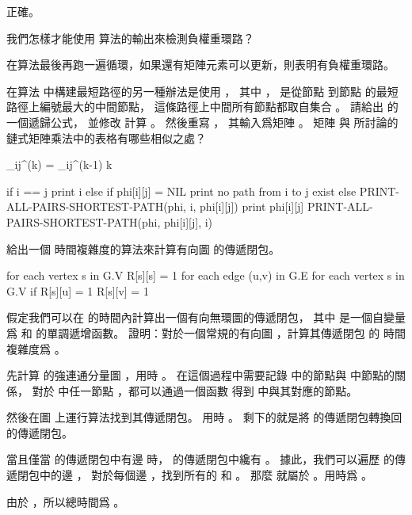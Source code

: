 \startANSWER
正確。
\stopANSWER

\startEXERCISE
我們怎樣才能使用  算法的輸出來檢測負權重環路？
\stopEXERCISE

\startANSWER
在算法最後再跑一遍循環，如果還有矩陣元素可以更新，則表明有負權重環路。
\stopANSWER

\startEXERCISE
在算法  中構建最短路徑的另一種辦法是使用 ，
其中 ，
  是從節點  到節點  的最短路徑上編號最大的中間節點，
這條路徑上中間所有節點都取自集合 。
請給出  的一個遞歸公式，
並修改  計算 。
然後重寫 ，
其輸入爲矩陣 。
矩陣 \m{\Phi} 與 所討論的鏈式矩陣乘法中的表格有哪些相似之處？
\stopEXERCISE

\startANSWER
\startformula
\phi_{ij}^{(k)} = \startcases
\NC \phi_{ij}^{(k-1)} \MC {} \NR
\NC k \MC {} \NR
\stopcases
\stopformula

\startCLRS
if i == j
	print i
else if phi[i][j] = NIL
	print no path from i to j exist
else
	PRINT-ALL-PAIRS-SHORTEST-PATH(phi, i, phi[i][j])
	print phi[i][j]
	PRINT-ALL-PAIRS-SHORTEST-PATH(phi, phi[i][j], i)
\stopCLRS
\stopANSWER

\startEXERCISE
給出一個  時間複雜度的算法來計算有向圖  的傳遞閉包。
\stopEXERCISE

\startANSWER
\startCLRS
for each vertex s in G.V
	R[s][s] = 1
for each edge (u,v) in G.E
	for each vertex s in G.V
		if R[s][u] = 1
			R[s][v] = 1
\stopCLRS
\stopANSWER

\startEXERCISE
假定我們可以在  的時間內計算出一個有向無環圖的傳遞閉包，
其中  是一個自變量爲  和  的單調遞增函數。
證明：對於一個常規的有向圖 ，計算其傳遞閉包  的
時間複雜度爲 。
\stopEXERCISE

\startANSWER
先計算  的強連通分量圖 ，用時 。
在這個過程中需要記錄  中的節點與  中節點的關係，
對於  中任一節點 ，都可以通過一個函數  得到  中與其對應的節點。

然後在圖  上運行算法找到其傳遞閉包。
用時 。
剩下的就是將  的傳遞閉包轉換回  的傳遞閉包。

當且僅當  的傳遞閉包中有邊  時，
  的傳遞閉包中纔有 。
據此，我們可以遍歷  的傳遞閉包中的邊 ，
對於每個邊 ，找到所有的  和 。
那麼  就屬於 。用時爲 。

由於 ，所以總時間爲 。
\stopANSWER

\stopsection

